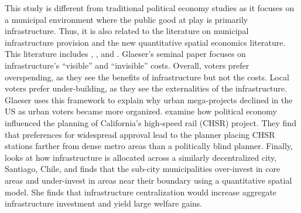 This study is different from traditional political economy studies as it focuses on a municipal environment where the public good at play is primarily infrastructure. 
Thus, it is also related to the literature on municipal infrastructure provision and the new quantitative spatial economics literature.
This literature includes \cite{Glaeser2018political}, \cite{Fajgelbaum2023}, and \cite{bordeu2023commuting}.
Glaeser's seminal paper focuses on infrastructure's ``visible'' and ``invisible'' costs.
Overall, voters prefer overspending, as they see the benefits of infrastructure but not the costs.
Local voters prefer under-building, as they see the externalities of the infrastructure.
Glaeser uses this framework to explain why urban mega-projects declined in the US as urban voters became more organized.
\cite{Fajgelbaum2023} examine how political economy influenced the planning of California's high-speed rail (CHSR) project.
They find that preferences for widespread approval lead to the planner placing CHSR stations farther from dense metro areas than a politically blind planner.
Finally, \cite{bordeu2023commuting} looks at how infrastructure is allocated across a similarly decentralized city, Santiago, Chile, and finds that the sub-city municipalities over-invest in core areas and under-invest in areas near their boundary using a quantitative spatial model.
She finds that infrastructure centralization would increase aggregate infrastructure investment  and yield large welfare gains.